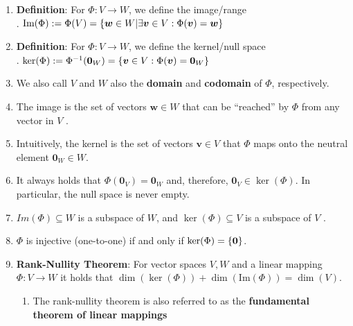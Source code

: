 \begin{enumerate}
    \item \textbf{Definition}: For $\Phi  : V \to W$, we define the image/range
    \hfill \cite{mfml/book/mml/Deisenroth-Faisal-Ong}
    \\
    .\hfill
    $
        \text{Im}(\Phi ) 
        := \Phi (V ) 
        = \left\{\bm{w} \in W|\exists \bm{v} \in V : \Phi (\bm{v}) = \bm{w}\right\}
    $
    \hfill \cite{mfml/book/mml/Deisenroth-Faisal-Ong}

    \item \textbf{Definition}: For $\Phi  : V \to W$, we define the kernel/null space
    \hfill \cite{mfml/book/mml/Deisenroth-Faisal-Ong}
    \\
    .\hfill
    $
        \ker(\Phi ) 
        := \Phi ^{-1} (\bm{0}_W ) 
        = \left\{\bm{v} \in V : \Phi (\bm{v}) = \bm{0}_W \right\}
    $
    \hfill \cite{mfml/book/mml/Deisenroth-Faisal-Ong}


    \item We also call $V$ and $W$ also the \textbf{domain} and \textbf{codomain} of $\Phi$, respectively.
    \hfill \cite{mfml/book/mml/Deisenroth-Faisal-Ong}

    \item The image is the set of vectors $\bm{w} \in W$ that can be “reached” by $\Phi$ from any vector in $V$ .
    \hfill \cite{mfml/book/mml/Deisenroth-Faisal-Ong}

    \item Intuitively, the kernel is the set of vectors $\bm{v} \in V$ that $\Phi$ maps onto the neutral element $\bm{0}_W \in W$.
    \hfill \cite{mfml/book/mml/Deisenroth-Faisal-Ong}

    \item It always holds that $\Phi(\bm{0}_V ) = \bm{0}_W$ and, therefore, $\bm{0}_V \in \ker(\Phi)$. 
    In particular, the null space is never empty.
    \hfill \cite{mfml/book/mml/Deisenroth-Faisal-Ong}

    \item $Im(\Phi) \subseteq W$ is a subspace of $W$, and $\ker(\Phi) \subseteq V$ is a subspace of $V$ .
    \hfill \cite{mfml/book/mml/Deisenroth-Faisal-Ong}

    \item $\Phi$ is injective (one-to-one) if and only if $\ker(\Phi) = \left\{\bm{0}\right\}$.
    \hfill \cite{mfml/book/mml/Deisenroth-Faisal-Ong}

    \item \textbf{Rank-Nullity Theorem}: For vector spaces $V, W$ and a linear mapping $\Phi : V \to W$ it holds that $\dim(\ker(\Phi)) + \dim(\text{Im}(\Phi)) = \dim(V )$.
    \hfill \cite{mfml/book/mml/Deisenroth-Faisal-Ong}
    \begin{enumerate}
        \item The rank-nullity theorem is also referred to as the \textbf{fundamental theorem of linear mappings}
        \hfill \cite{mfml/book/mml/Deisenroth-Faisal-Ong}


\end{enumerate}
\end{enumerate}
